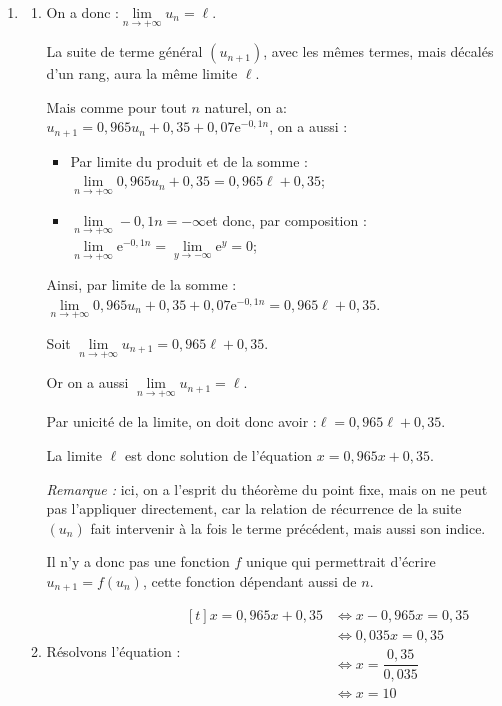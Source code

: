 \documentclass[10pt]{article}
\providecommand{\e}{{\mathrm{e}}}
\begin{document}
\begin{enumerate}
			\item \begin{enumerate}
				\item On a donc :\quad $\lim\limits_{n \to +\infty} u_n = \ell$.

				La suite de terme général $(u_{n+1})$, avec les mêmes termes, mais décalés d'un rang, aura la même limite $\ell$.

				Mais comme pour tout $n$ naturel, on a:\quad $u_{n+1} = 0,965u_n + 0,35 + 0,07\e^{-0,1n}$, on a aussi :

				\begin{itemize}[label=\textbullet~]
					\item Par limite du produit et de la somme : $\lim\limits_{n \to +\infty} 0,965u_n + 0,35 = 0,965\ell + 0,35$;
					\item $\lim\limits_{n \to +\infty} -0,1n = -\infty$\quad et donc, par composition :\quad $\lim\limits_{n \to +\infty} \e^{-0,1n} = \lim\limits_{y \to -\infty} \e^{y} = 0$;
				\end{itemize}

				Ainsi, par limite de la somme :\quad $\lim\limits_{n \to +\infty} 0,965u_n + 0,35 +0,07\e^{-0,1n} = 0,965\ell + 0,35$.

				Soit \quad $\lim\limits_{n \to +\infty} u_{n+1} = 0,965\ell + 0,35$.

				Or on a aussi \quad $\lim\limits_{n \to +\infty} u_{n+1} = \ell$.

				Par unicité de la limite, on doit donc avoir :\quad $\ell = 0,965\ell + 0,35$.

				La limite $\ell $ est donc solution de l'équation \quad $x=0,965 x+0,35$.

				\emph{Remarque :} ici, on a l'esprit du théorème du point fixe, mais on ne peut pas l'appliquer directement, car la relation de récurrence de la suite $(u_n)$ fait intervenir à la fois le terme précédent, mais aussi son indice.

				Il n'y a donc pas une fonction $f$ unique qui permettrait d'écrire $u_{n+1} = f(u_n)$, cette fonction dépendant aussi de $n$.

				\item Résolvons l'équation :\quad $\begin{aligned}[t]
					x = 0,965x + 0,35
						&\iff x - 0,965x = 0,35\\
						&\iff 0,035x = 0,35\\
						&\iff x = \dfrac{0,35}{0,035}\\
						&\iff x = 10
				\end{aligned}$


\end{enumerate}
\end{enumerate}
\end{document}
